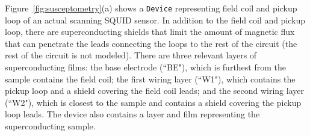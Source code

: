 \documentclass[final,3p,times]{elsarticle}
\newcommand{\inline}[1]{\texttt{#1}\xspace}
\begin{document}
Figure~\ref{fig:susceptometry}(a) shows a \inline{Device} representing field coil and pickup loop of an actual scanning SQUID sensor. In addition to the field coil and pickup loop, there are superconducting shields that limit the amount of magnetic flux that can penetrate the leads connecting the loops to the rest of the circuit (the rest of the circuit is not modeled). There are three relevant layers of superconducting films: the base electrode (``BE"), which is furthest from the sample contains the field coil; the first wiring layer (``W1"), which contains the pickup loop and a shield covering the field coil leads; and the second wiring layer (``W2"), which is closest to the sample and contains a shield covering the pickup loop leads. The device also contains a layer and film representing the superconducting sample.


\end{document}
